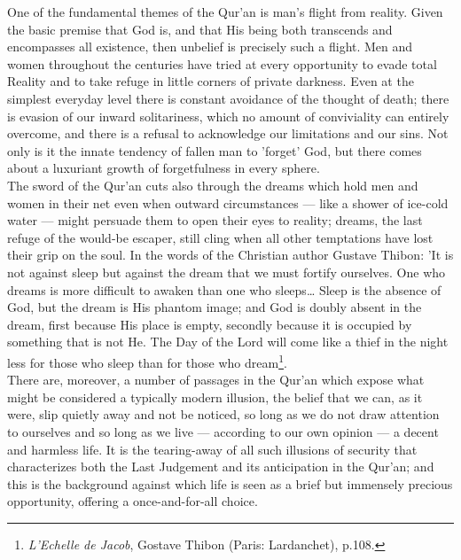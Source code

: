 \documentclass[11pt, b5paper, twoside]{book}
\begin{document}
One of the fundamental themes of the Qur'an is man's flight from reality. Given the basic premise 
that God is, and that His being both transcends and encompasses all existence, then unbelief is 
precisely such a flight. Men and women throughout the centuries have tried at every opportunity to 
evade total Reality and to take refuge in little corners of private darkness. Even at the simplest 
everyday level there is constant avoidance of the thought of death; there is evasion of our inward 
solitariness, which no amount of conviviality can entirely overcome, and there is a refusal to 
acknowledge our limitations and our sins. Not only is it the innate tendency of fallen man to 
'forget' God, but there comes about a luxuriant growth of forgetfulness in every sphere. \\

The sword of the Qur'an cuts also through the dreams which hold men and women in their net even when 
outward circumstances --- like a shower of ice-cold water --- might persuade them to open their eyes to 
reality; dreams, the last refuge of the would-be escaper, still cling when all other temptations have 
lost their grip on the soul. In the words of the Christian author Gustave Thibon: 'It is not against 
sleep but against the dream that we must fortify ourselves. One who dreams is more difficult to 
awaken than one who sleeps\ldots{} Sleep is the absence of God, but the dream is His phantom image; and God is doubly absent in the dream, first because His place is empty, secondly because it is occupied 
by something that is not He. The Day of the Lord will come like a thief in the night less for those 
who sleep than for those who dream\footnote{\emph{L'Echelle de Jacob}, Gostave Thibon (Paris: Lardanchet), p.108.}.\\

There are, moreover, a number of passages in the Qur'an which expose what might be considered a 
typically modern illusion, the belief that we can, as it were, slip quietly away and not be noticed, 
so long as we do not draw attention to ourselves and so long as we live --- according to our own 
opinion --- a decent and harmless life. It is the tearing-away of all such illusions of security that 
characterizes both the Last Judgement and its anticipation in the Qur'an; and this is the background 
against which life is seen as a brief but immensely precious opportunity, offering a once-and-for-all 
choice. \\
\end{document}
